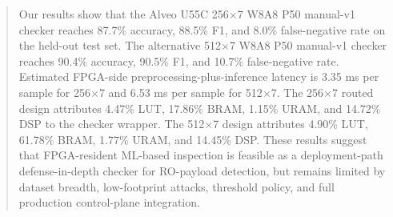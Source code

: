 \documentclass[a4paper, oneside]{discothesis}
\begin{document}
\begin{abstract}
Our results show that the Alveo U55C 256$\times$7 W8A8 P50 manual-v1 checker reaches 87.7\% accuracy, 88.5\% F1, and 8.0\% false-negative rate on the held-out test set. The alternative 512$\times$7 W8A8 P50 manual-v1 checker reaches 90.4\% accuracy, 90.5\% F1, and 10.7\% false-negative rate. Estimated FPGA-side preprocessing-plus-inference latency is 3.35 ms per sample for 256$\times$7 and 6.53 ms per sample for 512$\times$7. The 256$\times$7 routed design attributes 4.47\% LUT, 17.86\% BRAM, 1.15\% URAM, and 14.72\% DSP to the checker wrapper. The 512$\times$7 design attributes 4.90\% LUT, 61.78\% BRAM, 1.77\% URAM, and 14.45\% DSP. These results suggest that FPGA-resident ML-based inspection is feasible as a deployment-path defense-in-depth checker for RO-payload detection, but remains limited by dataset breadth, low-footprint attacks, threshold policy, and full production control-plane integration.

\end{abstract}
\tableofcontents

\mainmatter %



















\end{document}
